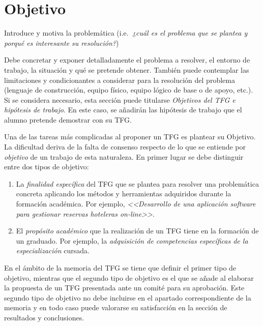 \chapter{Objetivo}
\label{cap:Objetivo}

Introduce y motiva la problemática (i.e.\emph{\ ¿cuál es el problema que se plantea y porqué es interesante su resolución?})

Debe concretar y exponer detalladamente el problema a resolver, el entorno de trabajo, la situación y qué se pretende obtener. También puede contemplar las limitaciones y condicionantes a considerar para la resolución del problema (lenguaje de construcción, equipo físico, equipo lógico de base o de apoyo, etc.). Si se considera necesario, esta sección puede titularse \emph{Objetivos del TFG e hipótesis de trabajo}. En este caso, se añadirán las hipótesis de trabajo que el alumno pretende demostrar con su TFG.

Una de las tareas más complicadas al proponer un TFG es plantear su Objetivo. La dificultad deriva de la falta de consenso respecto de lo que se entiende por \emph{objetivo} de un trabajo de esta naturaleza. En primer lugar se debe distinguir entre dos tipos de objetivo:

\begin{enumerate}
	\item La \emph{finalidad específica} del TFG que se plantea para resolver una problemática concreta aplicando los métodos y herramientas adquiridos durante la formación académica. Por ejemplo, \emph{<<Desarrollo de una aplicación software para gestionar reservas hoteleras \emph{on-line}>>}.
	
	\item El \emph{propósito académico} que la realización de un TFG tiene en la formación de un graduado. Por ejemplo, la \emph{adquisición de competencias específicas de la especialización} cursada.
\end{enumerate}

En el ámbito de la memoria del TFG se tiene que definir el primer tipo de objetivo, mientras que el segundo tipo de objetivo es el que se añade al elaborar la propuesta de un TFG presentada ante un comité para su aprobación. Este segundo tipo de objetivo no debe incluirse en el apartado correspondiente de la memoria y en todo caso puede valorarse su satisfacción en la sección de resultados y conclusiones.

